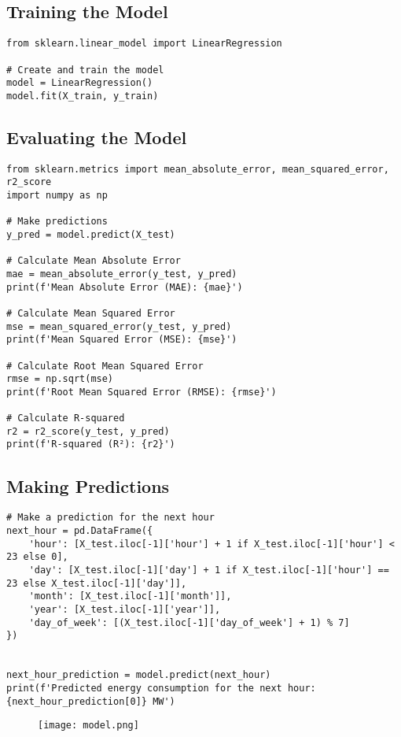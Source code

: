 \documentclass{article}
\begin{document}
\subsection{Training the Model}

\begin{lstlisting}[caption={Training a Linear Regression model}]
from sklearn.linear_model import LinearRegression

# Create and train the model
model = LinearRegression()
model.fit(X_train, y_train)
\end{lstlisting}

\subsection{Evaluating the Model}

\begin{lstlisting}[caption={Evaluating the model}]
from sklearn.metrics import mean_absolute_error, mean_squared_error, r2_score
import numpy as np

# Make predictions
y_pred = model.predict(X_test)

# Calculate Mean Absolute Error
mae = mean_absolute_error(y_test, y_pred)
print(f'Mean Absolute Error (MAE): {mae}')

# Calculate Mean Squared Error
mse = mean_squared_error(y_test, y_pred)
print(f'Mean Squared Error (MSE): {mse}')

# Calculate Root Mean Squared Error
rmse = np.sqrt(mse)
print(f'Root Mean Squared Error (RMSE): {rmse}')

# Calculate R-squared
r2 = r2_score(y_test, y_pred)
print(f'R-squared (R²): {r2}')
\end{lstlisting}

\subsection{Making Predictions}

\begin{lstlisting}[caption={Making predictions for the next hour}]
# Make a prediction for the next hour
next_hour = pd.DataFrame({
    'hour': [X_test.iloc[-1]['hour'] + 1 if X_test.iloc[-1]['hour'] < 23 else 0],
    'day': [X_test.iloc[-1]['day'] + 1 if X_test.iloc[-1]['hour'] == 23 else X_test.iloc[-1]['day']],
    'month': [X_test.iloc[-1]['month']],
    'year': [X_test.iloc[-1]['year']],
    'day_of_week': [(X_test.iloc[-1]['day_of_week'] + 1) % 7]
})


next_hour_prediction = model.predict(next_hour)
print(f'Predicted energy consumption for the next hour: {next_hour_prediction[0]} MW')
\end{lstlisting}
\begin{figure}[H]
    \centering
    \texttt{[image: model.png]}
\end{figure}
\end{document}
